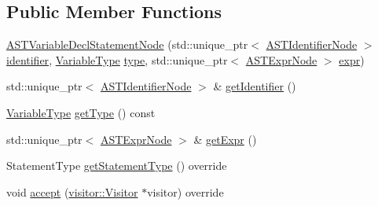 \subsection*{Public Member Functions}
\begin{DoxyCompactItemize}
\item 
\hyperlink{classparser_1_1ast_1_1ASTVariableDeclStatementNode_ab05aabaf5dd61a54a3b05101c9457260}{A\+S\+T\+Variable\+Decl\+Statement\+Node} (std\+::unique\+\_\+ptr$<$ \hyperlink{classparser_1_1ast_1_1ASTIdentifierNode}{A\+S\+T\+Identifier\+Node} $>$ \hyperlink{classparser_1_1ast_1_1ASTVariableDeclStatementNode_ac835afc9e99d1e9e1af10db2ade9f901}{identifier}, \hyperlink{ASTVariableDeclStatementNode_8h_a1e8e1bde0729627e3a22ffa858d5f3b9}{Variable\+Type} \hyperlink{classparser_1_1ast_1_1ASTVariableDeclStatementNode_a03d5695c58afabacdbfcf98950a65493}{type}, std\+::unique\+\_\+ptr$<$ \hyperlink{classparser_1_1ast_1_1ASTExprNode}{A\+S\+T\+Expr\+Node} $>$ \hyperlink{classparser_1_1ast_1_1ASTVariableDeclStatementNode_a5c648465737a76a89f91750b56741557}{expr})
\item 
std\+::unique\+\_\+ptr$<$ \hyperlink{classparser_1_1ast_1_1ASTIdentifierNode}{A\+S\+T\+Identifier\+Node} $>$ \& \hyperlink{classparser_1_1ast_1_1ASTVariableDeclStatementNode_add29f076ef275098eb63064e2441d4dd}{get\+Identifier} ()
\item 
\hyperlink{ASTVariableDeclStatementNode_8h_a1e8e1bde0729627e3a22ffa858d5f3b9}{Variable\+Type} \hyperlink{classparser_1_1ast_1_1ASTVariableDeclStatementNode_a5f26584b63fff33a9bc55c595ab1d3ab}{get\+Type} () const
\item 
std\+::unique\+\_\+ptr$<$ \hyperlink{classparser_1_1ast_1_1ASTExprNode}{A\+S\+T\+Expr\+Node} $>$ \& \hyperlink{classparser_1_1ast_1_1ASTVariableDeclStatementNode_aaa330017ed4652ecb8d9900ac774b60f}{get\+Expr} ()
\item 
Statement\+Type \hyperlink{classparser_1_1ast_1_1ASTVariableDeclStatementNode_a273b2c22a426022608813603ddfd820b}{get\+Statement\+Type} () override
\item 
void \hyperlink{classparser_1_1ast_1_1ASTVariableDeclStatementNode_a4448c73408ed86719c6f3993a4eb8869}{accept} (\hyperlink{classvisitor_1_1Visitor}{visitor\+::\+Visitor} $\ast$visitor) override
\end{DoxyCompactItemize}

